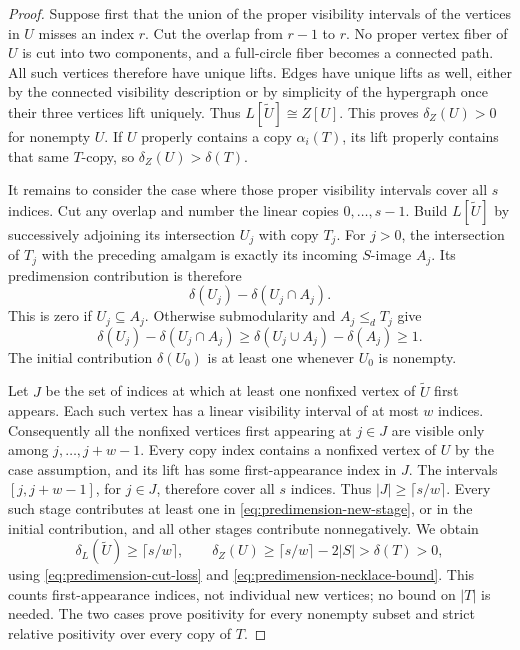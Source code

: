\begin{proof}
Suppose first that the union of the proper visibility intervals of
the vertices in $U$ misses an index $r$. Cut the overlap from $r-1$
to $r$. No proper vertex fiber of $U$ is cut into two components,
and a full-circle fiber becomes a connected path. All such vertices
therefore have unique lifts. Edges have unique lifts as well, either
by the connected visibility description or by simplicity of the
hypergraph once their three vertices lift uniquely. Thus
$L[\widetilde U]\cong Z[U]$. This proves $\delta_Z(U)>0$ for
nonempty $U$. If $U$ properly contains a copy $\alpha_i(T)$, its
lift properly contains that same $T$-copy, so
$\delta_Z(U)>\delta(T)$.

It remains to consider the case where those proper visibility
intervals cover all $s$ indices. Cut any overlap and number the
linear copies $0,\ldots,s-1$. Build $L[\widetilde U]$ by successively
adjoining its intersection $U_j$ with copy $T_j$. For $j>0$, the
intersection of $T_j$ with the preceding amalgam is exactly its
incoming $S$-image $A_j$. Its predimension contribution is therefore
\[
 \delta(U_j)-\delta(U_j\cap A_j).
\]
This is zero if $U_j\subseteq A_j$. Otherwise submodularity and
$A_j\leq_d T_j$ give
\[
 \delta(U_j)-\delta(U_j\cap A_j)
 \geq\delta(U_j\cup A_j)-\delta(A_j)\geq1.
 \tag{2}\label{eq:predimension-new-stage}
\]
The initial contribution $\delta(U_0)$ is at least one whenever
$U_0$ is nonempty.

Let $J$ be the set of indices at which at least one nonfixed vertex
of $\widetilde U$ first appears. Each such vertex has a linear
visibility interval of at most $w$ indices. Consequently all the
nonfixed vertices first appearing at $j\in J$ are visible only
among $j,\ldots,j+w-1$. Every copy index contains a nonfixed vertex
of $U$ by the case assumption, and its lift has some first-appearance
index in $J$. The intervals $[j,j+w-1]$, for $j\in J$, therefore
cover all $s$ indices. Thus $|J|\geq\lceil s/w\rceil$. Every such
stage contributes at least one in
\eqref{eq:predimension-new-stage}, or in the initial contribution,
and all other stages contribute nonnegatively. We obtain
\[
 \delta_L(\widetilde U)\geq\lceil s/w\rceil,
 \qquad
 \delta_Z(U)\geq\lceil s/w\rceil-2|S|>\delta(T)>0,
\]
using \eqref{eq:predimension-cut-loss} and
\eqref{eq:predimension-necklace-bound}. This counts first-appearance
indices, not individual new vertices; no bound on $|T|$ is needed.
The two cases prove positivity for every nonempty subset and strict
relative positivity over every copy of $T$.
\end{proof}

